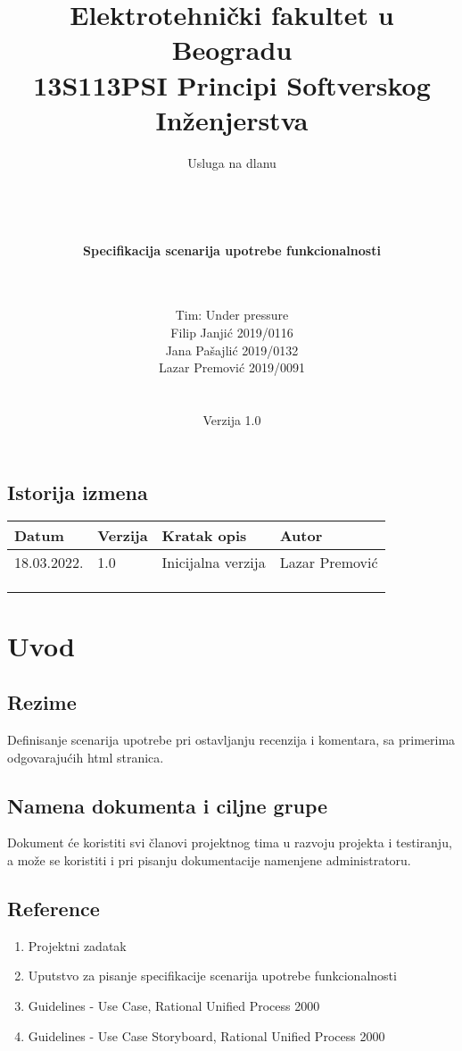 \documentclass[a4paper,12pt]{report}
\title{\Large Elektrotehnički fakultet u Beogradu \\ 13S113PSI Principi Softverskog Inženjerstva}
\author{\Huge Usluga na dlanu\\ \ \\ \ \\ \ \\ \ \\
	\Large \textbf{Specifikacija scenarija upotrebe funkcionalnosti}\\\Large \textbf{\genitivfunkcionalnosti} \\ \ \\}
\date{\Large   Tim: Under pressure \\ Filip Janjić 2019/0116 \\ Jana Pašajlić 2019/0132 \\ Lazar Premović 2019/0091  \\ \  \\ \  \\
	\large Verzija 1.0}
\newcommand{\dativfunkcionalnosti }{ostavljanju recenzija i komentara}
\newcommand{\inicijalniautor}{Lazar Premović}
\newcommand{\inicijalnidatum}{18.03.2022.}
\begin{document}
	
	\maketitle
	
	\begin{center}
		\section*{Istorija izmena}
			\begin{tabular}{ |l|l|l|l| }
				\hline
				\textbf{Datum} & \textbf{Verzija} & \textbf{Kratak opis} & \textbf{Autor} \\ 
				\hline
				\inicijalnidatum & 1.0  & Inicijalna verzija & \inicijalniautor \\
				\hline
				 &  & &  \\
				\hline
				&  &  &  \\
				\hline
				&  &  &  \\
				\hline
			\end{tabular}
	\end{center}
	
	\newpage
	
	\tableofcontents
	
	\newpage
	
	\section{Uvod}
		\subsection{Rezime}
			Definisanje scenarija upotrebe pri \dativfunkcionalnosti, sa primerima odgovarajućih html stranica.
		\subsection{Namena dokumenta i ciljne grupe}
			Dokument će koristiti svi članovi projektnog tima u razvoju projekta i testiranju, a može se koristiti i pri pisanju dokumentacije namenjene administratoru.
		\subsection{Reference}
			\begin{enumerate}
				\item Projektni zadatak
				\item Uputstvo za pisanje specifikacije scenarija upotrebe funkcionalnosti
				\item Guidelines - Use Case, Rational Unified Process 2000
				\item Guidelines - Use Case Storyboard, Rational Unified Process 2000
			\end{enumerate}
\end{document}
